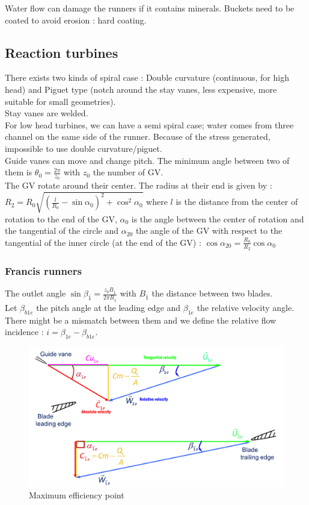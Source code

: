 \documentclass[../main.tex]{subfiles}
\begin{document}
Water flow can damage the runners if it contains minerals. Buckets need to be coated to avoid erosion : hard coating.\\

\subsection{Reaction turbines}


There exists two kinds of spiral case : Double curvature (continuous, for high head) and Piguet type (notch around the stay vanes, less expensive, more suitable for small geometries).\\
Stay vanes are welded.\\
For low head turbines, we can have a semi spiral case; water comes from three channel on the same side of the runner. Because of the stress generated, impossible to use double curvature/piguet.\\
Guide vanes can move and change pitch. The minimum angle between two of them is $\theta_0 = \frac{2\pi}{z_0}$ with $z_0$ the number of GV.\\
The GV rotate around their center. The radius at their end is given by : $R_2 = R_0 \sqrt{ (\frac{l}{R_0} - \sin \alpha_0)^2 + \cos^2 \alpha_0}$ where $l$ is the distance from the center of rotation to the end of the GV, $\alpha_0$ is the angle between the center of rotation and the tangential of the circle and $\alpha_{20}$ the angle of the GV with respect to the tangential of the inner circle (at the end of the GV) : $\cos \alpha_{20} = \frac{R_0}{R_2} \cos \alpha_0$\\

\subsubsection{Francis runners}

The outlet angle $\sin\beta_{\overline{1}} = \frac{z_b B_{\overline{1}}}{2\pi R_{\overline{1}}}$ with $B_{\overline{1}}$ the distance between two blades.\\

Let $\beta_{b1e}$ the pitch angle at the leading edge and $\beta_{1e}$ the relative velocity angle. There might be a mismatch between them and we define the relative flow incidence : $i = \beta_{1e} - \beta_{b1e}$.\\

\begin{figure}[hbt!]
    \centering
    \includegraphics[width=0.7\linewidth]{IMAGES/Hydraulic/IMG_0190.jpeg}
    \caption{Maximum efficiency point}
\end{figure}
\end{document}
